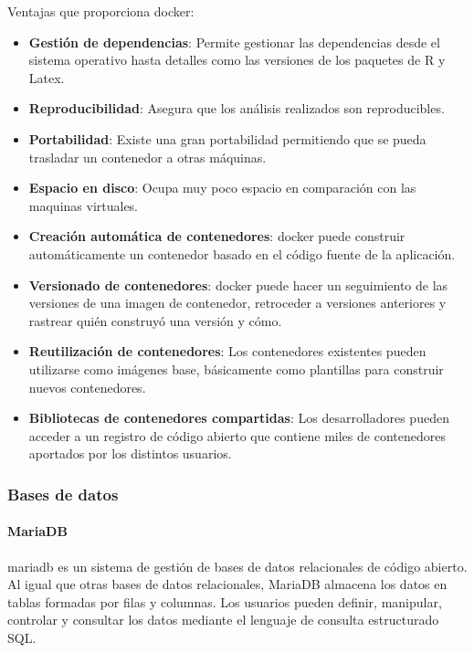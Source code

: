 \documentclass[../../main.tex]{subfiles}
\begin{document}
Ventajas que proporciona \Gls{docker}:
\begin{itemize}
    \item \textbf{Gestión de dependencias}: Permite gestionar las dependencias desde el sistema operativo hasta detalles como las versiones de los paquetes de R y Latex.
    
    \item \textbf{Reproducibilidad}: Asegura que los análisis realizados son reproducibles.
    
    \item \textbf{Portabilidad}: Existe una gran portabilidad permitiendo que se pueda trasladar un contenedor a otras máquinas.
    
    \item \textbf{Espacio en disco}: Ocupa muy poco espacio en comparación con las maquinas virtuales.
    
    \item \textbf{Creación automática de contenedores}: \Gls{docker} puede construir automáticamente un contenedor basado en el código fuente de la aplicación.
    
    \item \textbf{Versionado de contenedores}: \Gls{docker} puede hacer un seguimiento de las versiones de una imagen de contenedor, retroceder a versiones anteriores y rastrear quién construyó una versión y cómo.
    
    \item \textbf{Reutilización de contenedores}: Los contenedores existentes pueden utilizarse como imágenes base, básicamente como plantillas para construir nuevos contenedores.
    
    \item \textbf{Bibliotecas de contenedores compartidas}: Los desarrolladores pueden acceder a un registro de código abierto que contiene miles de contenedores aportados por los distintos usuarios.
\end{itemize}


\subsubsection{Bases de datos}
\paragraph{MariaDB}
\gls{mariadb}\cite{doc11} es un sistema de gestión de bases de datos relacionales de código abierto. Al igual que otras bases de datos relacionales, MariaDB almacena los datos en tablas formadas por filas y columnas. Los usuarios pueden definir, manipular, controlar y consultar los datos mediante el lenguaje de consulta estructurado SQL.  \\
\end{document}
